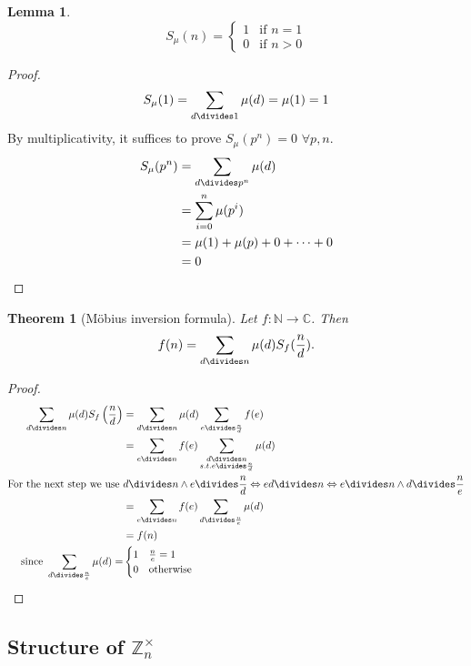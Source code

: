 \documentclass[a4paper]{article}
\newtheorem{lemma}{Lemma}
\newtheorem{theorem}{Theorem}
\newcommand{\N}{\mathbb{N}}
\newcommand{\Z}{\mathbb{Z}}
\newcommand{\C}{\mathbb{C}}
\begin{document}
\begin{lemma}
  \[
    S_\mu(n) = \begin{cases}
      1 & \text{if } n=1 \\
      0 & \text{if } n>0
    \end{cases}
  \]
\end{lemma}

\begin{proof}
  \[ S_\mu(1) = \sum_{d\divides 1} \mu(d) = \mu(1) = 1 \]
  By multiplicativity, it suffices to prove $S_\mu(p^n) = 0$ $\forall p,n$.
  \begin{align*}
    S_\mu(p^n) &= \sum_{d\divides p^n} \mu(d) \\
               &= \sum_{i=0}^n \mu(p^i) \\
               &= \mu(1) + \mu(p) + 0 +\dots+0 \\
               &= 0
  \end{align*}
\end{proof}

\begin{theorem}[Möbius inversion formula]
  Let $f: \N \to \C$. Then
  \[ f(n) = \sum_{d\divides n} \mu(d) S_f(\frac{n}{d}) \text{.}\]
\end{theorem}

\begin{proof}
  \begin{align*}
    \sum_{d\divides n} \mu(d) S_f\left(\frac{n}{d}\right)
      &= \sum_{d\divides n} \mu(d) \sum_{e\divides \frac{n}{d}} f(e) \\
      &= \sum_{e\divides n} f(e) \sum_{\substack{d\divides n \\ s.t. e\divides \frac{n}{d}}} \mu(d) \\
      \text{For the next step we use }
		    &d\divides n \land e\divides \frac{n}{d}
		    \Leftrightarrow e d \divides n
		    \Leftrightarrow e\divides n \land d\divides \frac{n}{e}\\
      &= \sum_{e\divides n} f(e) \sum_{d\divides  \frac{n}{e}} \mu(d)\\
      &= f(n)\\
      \text{since }
        \sum_{d\divides  \frac{n}{e}} \mu(d) =
		&\begin{cases}
		  1 & \frac{n}{e} = 1 \\
		  0 & \text{otherwise}
		\end{cases}
  \end{align*}
\end{proof}


\subsection{Structure of $\Z_n^\times$}
\end{document}
